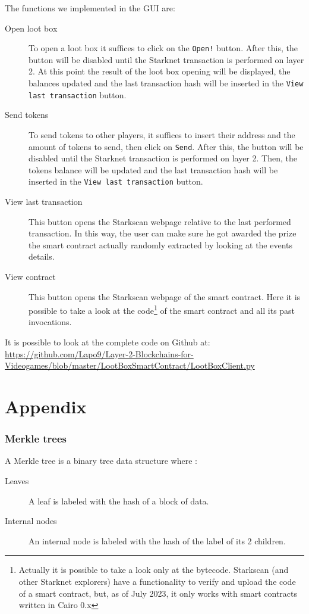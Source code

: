 \documentclass[12pt]{article}
\begin{document}
The functions we implemented in the GUI are:
\begin{description}
    \item[Open loot box] To open a loot box it suffices to click on the \verb|Open!| button. After this, the button will be disabled until the Starknet transaction is performed on layer 2. At this point the result of the loot box opening will be displayed, the balances updated and the last transaction hash will be inserted in the \verb|View last transaction| button.
    \item[Send tokens] To send tokens to other players, it suffices to insert their address and the amount of tokens to send, then click on \verb|Send|. After this, the button will be disabled until the Starknet transaction is performed on layer 2. Then, the tokens balance will be updated and the last transaction hash will be inserted in the \verb|View last transaction| button.
    \item[View last transaction] This button opens the Starkscan webpage relative to the last performed transaction. In this way, the user can make sure he got awarded the prize the smart contract actually randomly extracted by looking at the events details.
    \item[View contract] This button opens the Starkscan webpage of the smart contract. Here it is possible to take a look at the code\footnote{Actually it is possible to take a look only at the bytecode. Starkscan (and other Starknet explorers) have a functionality to verify and upload the code of a smart contract, but, as of July 2023, it only works with smart contracts written in Cairo 0.x} of the smart contract and all its past invocations.
\end{description}

It is possible to look at the complete code on Github at: \url{https://github.com/Lapo9/Layer-2-Blockchains-for-Videogames/blob/master/LootBoxSmartContract/LootBoxClient.py}

\newpage
\part{Appendix} \label{part:appendix}
\section{Merkle trees} \label{section:merkle_trees}
A Merkle tree is a binary tree data structure where \cite{ethereum_merkle_trees}:
\begin{description}
    \item[Leaves] A leaf is labeled with the hash of a block of data.
    \item[Internal nodes] An internal node is labeled with the hash of the label of its 2 children.
\end{description}
\end{document}
